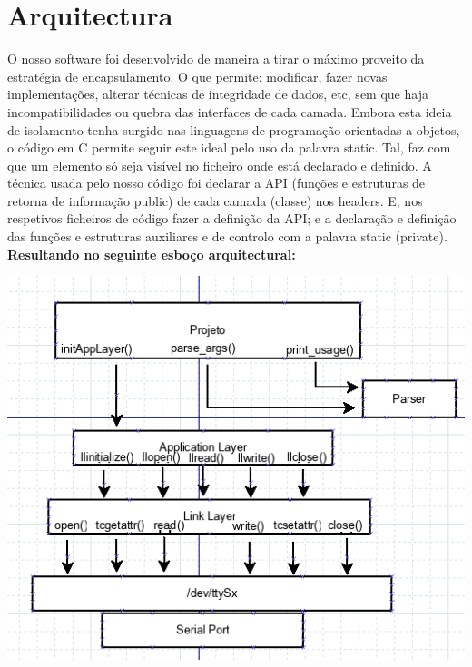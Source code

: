 \documentclass[a4paper]{article}
\begin{document}
\section{Arquitectura}
O nosso software foi desenvolvido de maneira a tirar o máximo proveito da
estratégia de encapsulamento. O que permite: modificar, fazer novas
implementações, alterar técnicas de integridade de dados, etc, sem que haja
incompatibilidades ou quebra das interfaces de cada camada. Embora esta ideia de isolamento
tenha surgido nas linguagens de programação orientadas a objetos, o código em C
permite seguir este ideal pelo uso da palavra static. Tal, faz com que um
elemento só seja visível no ficheiro onde está declarado e definido. A técnica
usada pelo nosso código foi declarar a API (funções e estruturas de retorna de
informação public) de cada camada (classe) nos headers. E, nos respetivos ficheiros de código
fazer a definição da API\@; e a declaração e definição das funções e estruturas
auxiliares e de controlo com a palavra static (private).
\\\newline\textbf{Resultando no seguinte esboço arquitectural:}\\\newline
\centerline{\includegraphics{API.png}}
\end{document}
